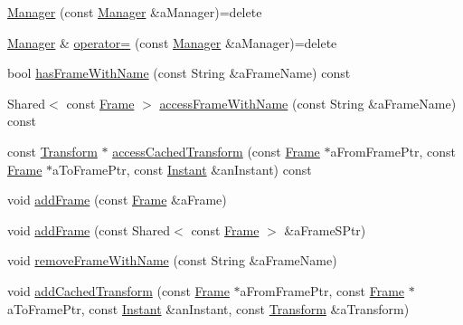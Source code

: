 \begin{DoxyCompactItemize}
\item 
\hyperlink{classlibrary_1_1physics_1_1coord_1_1frame_1_1_manager_a2a044628916a829eeaf4da33c2b187b3}{Manager} (const \hyperlink{classlibrary_1_1physics_1_1coord_1_1frame_1_1_manager}{Manager} \&a\+Manager)=delete
\item 
\hyperlink{classlibrary_1_1physics_1_1coord_1_1frame_1_1_manager}{Manager} \& \hyperlink{classlibrary_1_1physics_1_1coord_1_1frame_1_1_manager_a187a04c135f48ec850a1fd616dd92a3b}{operator=} (const \hyperlink{classlibrary_1_1physics_1_1coord_1_1frame_1_1_manager}{Manager} \&a\+Manager)=delete
\item 
bool \hyperlink{classlibrary_1_1physics_1_1coord_1_1frame_1_1_manager_a842f8a8060172178930aed212c4fcf6d}{has\+Frame\+With\+Name} (const String \&a\+Frame\+Name) const
\item 
Shared$<$ const \hyperlink{classlibrary_1_1physics_1_1coord_1_1_frame}{Frame} $>$ \hyperlink{classlibrary_1_1physics_1_1coord_1_1frame_1_1_manager_a13b4885965a111cebff6f04339d81596}{access\+Frame\+With\+Name} (const String \&a\+Frame\+Name) const
\item 
const \hyperlink{classlibrary_1_1physics_1_1coord_1_1_transform}{Transform} $\ast$ \hyperlink{classlibrary_1_1physics_1_1coord_1_1frame_1_1_manager_a1c506ae3841eaa03d2629df356ec8e28}{access\+Cached\+Transform} (const \hyperlink{classlibrary_1_1physics_1_1coord_1_1_frame}{Frame} $\ast$a\+From\+Frame\+Ptr, const \hyperlink{classlibrary_1_1physics_1_1coord_1_1_frame}{Frame} $\ast$a\+To\+Frame\+Ptr, const \hyperlink{classlibrary_1_1physics_1_1time_1_1_instant}{Instant} \&an\+Instant) const
\item 
void \hyperlink{classlibrary_1_1physics_1_1coord_1_1frame_1_1_manager_aa4215eb9b956a3b4a2933a33d98b7007}{add\+Frame} (const \hyperlink{classlibrary_1_1physics_1_1coord_1_1_frame}{Frame} \&a\+Frame)
\item 
void \hyperlink{classlibrary_1_1physics_1_1coord_1_1frame_1_1_manager_a65ef93583a62089cb3192527babddab6}{add\+Frame} (const Shared$<$ const \hyperlink{classlibrary_1_1physics_1_1coord_1_1_frame}{Frame} $>$ \&a\+Frame\+S\+Ptr)
\item 
void \hyperlink{classlibrary_1_1physics_1_1coord_1_1frame_1_1_manager_a63e05e289d34f354dafefbff2b8478af}{remove\+Frame\+With\+Name} (const String \&a\+Frame\+Name)
\item 
void \hyperlink{classlibrary_1_1physics_1_1coord_1_1frame_1_1_manager_a5b8f0ef450a7dfbda58f1c63e6efc7ac}{add\+Cached\+Transform} (const \hyperlink{classlibrary_1_1physics_1_1coord_1_1_frame}{Frame} $\ast$a\+From\+Frame\+Ptr, const \hyperlink{classlibrary_1_1physics_1_1coord_1_1_frame}{Frame} $\ast$a\+To\+Frame\+Ptr, const \hyperlink{classlibrary_1_1physics_1_1time_1_1_instant}{Instant} \&an\+Instant, const \hyperlink{classlibrary_1_1physics_1_1coord_1_1_transform}{Transform} \&a\+Transform)
\end{DoxyCompactItemize}
